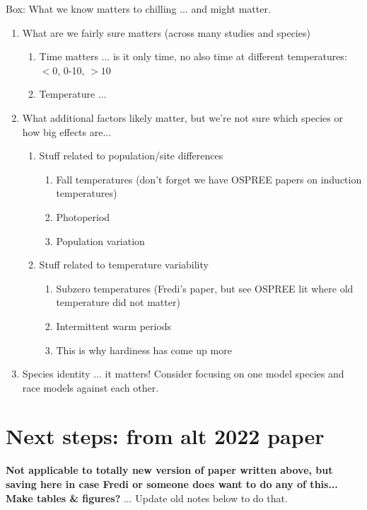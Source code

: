 \documentclass[11pt,letter]{article}
\begin{document}
Box: What we know matters to chilling ... and might matter. 
\begin{enumerate}
\item What are we fairly sure matters (across many studies and species)
\begin{enumerate}
\item Time matters ... is it only time, no also time at different temperatures: $<0$, 0-10, $>10$
\item Temperature ... 
\end{enumerate}
\item What additional factors likely matter, but we're not sure which species or how big effects are...
\begin{enumerate}
\item Stuff related to population/site differences
\begin{enumerate}
\item Fall temperatures (don't forget we have OSPREE papers on induction temperatures)
\item Photoperiod
\item Population variation
\end{enumerate}
\item Stuff related to temperature variability 
\begin{enumerate}
\item Subzero temperatures (Fredi's paper, but see OSPREE lit where old temperature did not matter)
\item Intermittent warm periods
\item This is why hardiness has come up more 
\end{enumerate}
\end{enumerate}
\item Species identity ... it matters! Consider focusing on one model species and race models against each other. 
\end{enumerate}

\clearpage

\section{Next steps: from alt 2022 paper}

{\bf Not applicable to totally new version of paper written above, but saving here in case Fredi or someone does want to do any of this...}\\

{\bf Make tables \& figures?} ... Update old notes below to do that. 
\end{document}

